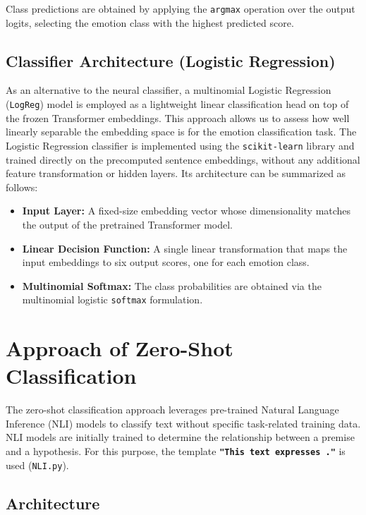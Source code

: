 \documentclass[runningheads]{llncs}
\begin{document}
\noindent
Class predictions are obtained by applying the \texttt{argmax} operation over the output logits, selecting the emotion class with the highest predicted score.

\subsection{Classifier Architecture (Logistic Regression)}

\noindent
As an alternative to the neural classifier, a multinomial Logistic Regression (\texttt{LogReg}) model is employed as a lightweight linear classification head on top of the frozen Transformer embeddings. This approach allows us to assess how well linearly separable the embedding space is for the emotion classification task. The Logistic Regression classifier is implemented using the \texttt{scikit-learn} library and trained directly on the precomputed sentence embeddings, without any additional feature transformation or hidden layers. Its architecture can be summarized as follows:
\begin{itemize}
    \item \textbf{Input Layer:} A fixed-size embedding vector whose dimensionality matches the output of the pretrained Transformer model.
    \item \textbf{Linear Decision Function:} A single linear transformation that maps the input embeddings to six output scores, one for each emotion class.
    \item \textbf{Multinomial Softmax:} The class probabilities are obtained via the multinomial logistic \texttt{softmax} formulation.
\end{itemize}

\vspace{-2em}
\section{Approach of Zero-Shot Classification}

\vspace{-1em}
The zero-shot classification approach leverages pre-trained Natural Language Inference (NLI) models to classify text without specific task-related training data. NLI models are initially trained to determine the relationship between a premise and a hypothesis. For this purpose, the template \textbf{\texttt{"This text expresses {}."}} is used (\texttt{NLI.py}).


\vspace{-1em}
\subsection{Architecture}
\end{document}
